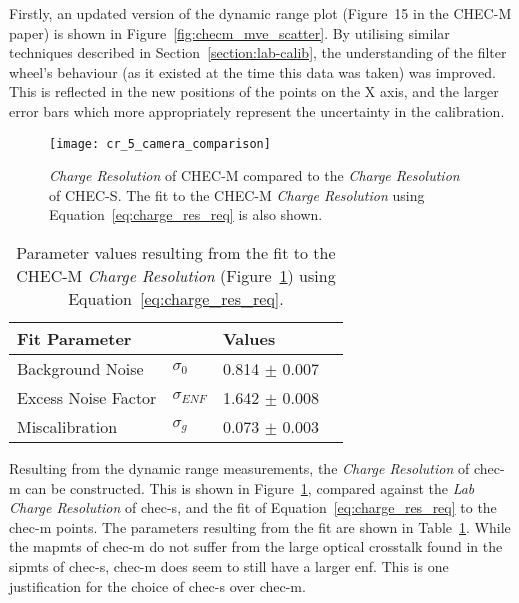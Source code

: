 Firstly, an updated version of the dynamic range plot (Figure~15 in the \mbox{CHEC-M} paper) is shown in Figure~\ref{fig:checm_mve_scatter}. By utilising similar techniques described in Section~\ref{section:lab-calib}, the understanding of the filter wheel's behaviour (as it existed at the time this data was taken) was improved. This is reflected in the new positions of the points on the X axis, and the larger error bars which more appropriately represent the uncertainty in the calibration.

\begin{figure}
	\centering
    \texttt{[image: cr\_5\_camera\_comparison]} 
	\caption[\textit{Charge Resolution} of CHEC-M.]{\textit{Charge Resolution} of CHEC-M compared to the \textit{Charge Resolution} of CHEC-S. The fit to the CHEC-M \textit{Charge Resolution} using Equation~\ref{eq:charge_res_req} is also shown.}
	\label{fig:cr_5_camera_comparison}
\end{figure}

\begin{table}[!ht]
\centering
\begin{tabular}{ll|ll} \toprule
    Fit Parameter        &                & Values             \\ \midrule
    Background Noise     & $\sigma_0$     & 0.814 $\pm$ 0.007  \\
    Excess Noise Factor  & $\sigma_{ENF}$ & 1.642 $\pm$ 0.008  \\
    Miscalibration       & $\sigma_g$     & 0.073 $\pm$ 0.003  \\ \bottomrule
\end{tabular}
\caption{Parameter values resulting from the fit to the CHEC-M \textit{Charge Resolution} (Figure~\ref{fig:cr_5_camera_comparison}) using Equation~\ref{eq:charge_res_req}.}
\label{table:cr_5_camera_comparison}
\end{table}

Resulting from the dynamic range measurements, the \textit{Charge Resolution} of \gls{chec-m} can be constructed. This is shown in Figure~\ref{fig:cr_5_camera_comparison}, compared against the \textit{Lab Charge Resolution} of \gls{chec-s}, and the fit of Equation~\ref{eq:charge_res_req} to the \gls{chec-m} points. The parameters resulting from the fit are shown in Table~\ref{table:cr_5_camera_comparison}. While the \glspl{mapmt} of \gls{chec-m} do not suffer from the large optical crosstalk found in the \glspl{sipmt} of \gls{chec-s}, \gls{chec-m} does seem to still have a larger \gls{enf}. This is one justification for the choice of \gls{chec-s} over \gls{chec-m}.
